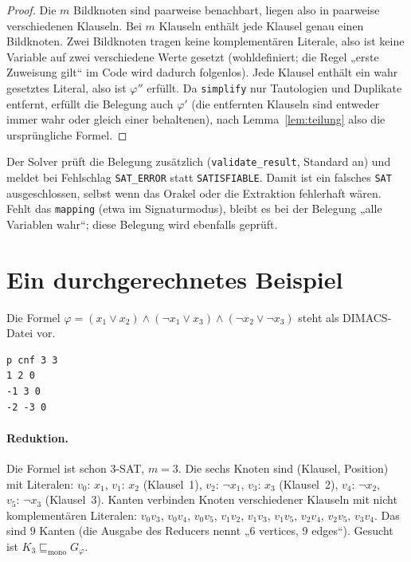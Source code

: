 \begin{proof}
	Die $m$ Bildknoten sind paarweise benachbart, liegen also in paarweise verschiedenen Klauseln. Bei $m$ Klauseln enthält jede Klausel genau einen Bildknoten. Zwei Bildknoten tragen keine komplementären Literale, also ist keine Variable auf zwei verschiedene Werte gesetzt (wohldefiniert; die Regel „erste Zuweisung gilt“ im Code wird dadurch folgenlos). Jede Klausel enthält ein wahr gesetztes Literal, also ist $\varphi''$ erfüllt. Da \texttt{simplify} nur Tautologien und Duplikate entfernt, erfüllt die Belegung auch $\varphi'$ (die entfernten Klauseln sind entweder immer wahr oder gleich einer behaltenen), nach Lemma~\ref{lem:teilung} also die ursprüngliche Formel.
\end{proof}

Der Solver prüft die Belegung zusätzlich (\texttt{validate\_result}, Standard an) und meldet bei Fehlschlag \texttt{SAT\_ERROR} statt \texttt{SATISFIABLE}. Damit ist ein falsches \texttt{SAT} ausgeschlossen, selbst wenn das Orakel oder die Extraktion fehlerhaft wären. Fehlt das \texttt{mapping} (etwa im Signaturmodus), bleibt es bei der Belegung „alle Variablen wahr“; diese Belegung wird ebenfalls geprüft.

\section{Ein durchgerechnetes Beispiel}
\label{sec:solver_beispiel}

Die Formel $\varphi=(x_1\vee x_2)\wedge(\neg x_1\vee x_3)\wedge(\neg x_2\vee\neg x_3)$ steht als DIMACS-Datei vor.

\begin{lstlisting}[caption={Eingabe \texttt{f1.cnf}}, label={lst:beispiel_cnf}]
p cnf 3 3
1 2 0
-1 3 0
-2 -3 0
\end{lstlisting}

\paragraph{Reduktion.} Die Formel ist schon 3-SAT, $m=3$. Die sechs Knoten sind (Klausel, Position) mit Literalen: $v_0{:}\,x_1$, $v_1{:}\,x_2$ (Klausel~1), $v_2{:}\,\neg x_1$, $v_3{:}\,x_3$ (Klausel~2), $v_4{:}\,\neg x_2$, $v_5{:}\,\neg x_3$ (Klausel~3). Kanten verbinden Knoten verschiedener Klauseln mit nicht komplementären Literalen: $v_0v_3$, $v_0v_4$, $v_0v_5$, $v_1v_2$, $v_1v_3$, $v_1v_5$, $v_2v_4$, $v_2v_5$, $v_3v_4$. Das sind $9$ Kanten (die Ausgabe des Reducers nennt „6 vertices, 9 edges“). Gesucht ist $K_3\sqsubseteq_{\mathrm{mono}}G_\varphi$.

